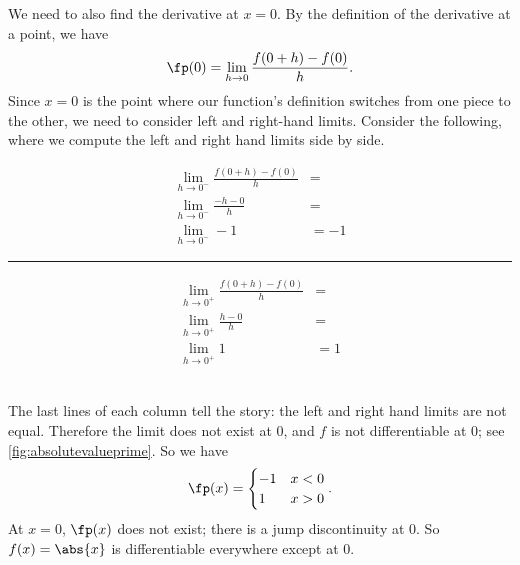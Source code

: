 \begin{example}
We need to also find the derivative at $x=0$. By the definition of the derivative at a point, we have
\[\fp(0) = \lim_{h\to0}\frac{f(0+h)-f(0)}{h}.\]
Since $x=0$ is the point where our function's definition switches from one piece to the other, we need to consider left and right-hand limits. Consider the following, where we compute the left and right hand limits side by side.\\
\begin{minipage}[b]{.49\linewidth}
\begin{align*}
\lim_{h\to0^-}\frac{f(0+h)-f(0)}{h} &= \\
\lim_{h\to0^-}\frac{-h-0}{h} &= \\
\lim_{h\to0^-}-1 & =-1
\end{align*}
\end{minipage}\rule{.5pt}{70pt}%
\begin{minipage}[b]{.49\linewidth}
\begin{align*}
\lim_{h\to0^+}\frac{f(0+h)-f(0)}{h} &= \\
\lim_{h\to0^+}\frac{h-0}{h} &= \\
\lim_{h\to0^+}1 & =1
\end{align*}
\end{minipage}\\
%
%
\noindent
The last lines of each column tell the story: the left and right hand limits are not equal. Therefore the limit does not exist at 0, and $f$ is not differentiable at 0; see \autoref{fig:absolutevalueprime}.\vspace{-.3\baselineskip}
So we have
\[\fp(x) = \begin{cases} -1 & x<0 \\ 1 & x>0\end{cases}.\] 
At $x=0$, $\fp(x)$ does not exist; there is a jump discontinuity at 0. So $f(x) = \abs{x}$ is differentiable everywhere except at 0.
\end{example}

